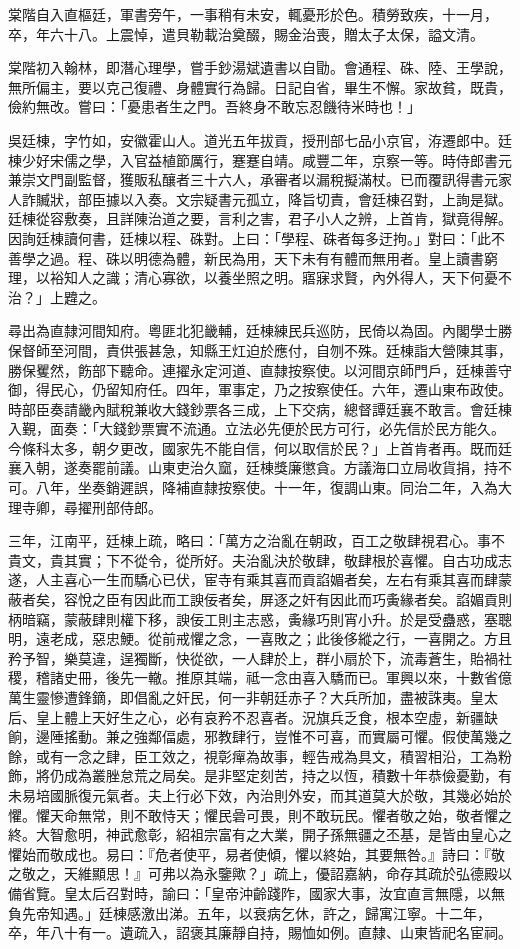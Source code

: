\begin{pinyinscope}
棠階自入直樞廷，軍書旁午，一事稍有未安，輒憂形於色。積勞致疾，十一月，卒，年六十八。上震悼，遣貝勒載治奠醊，賜金治喪，贈太子太保，謚文清。

棠階初入翰林，即潛心理學，嘗手鈔湯斌遺書以自勖。會通程、硃、陸、王學說，無所偏主，要以克己復禮、身體實行為歸。日記自省，畢生不懈。家故貧，既貴，儉約無改。嘗曰：「憂患者生之門。吾終身不敢忘忍饑待米時也！」

吳廷棟，字竹如，安徽霍山人。道光五年拔貢，授刑部七品小京官，洊遷郎中。廷棟少好宋儒之學，入官益植節厲行，蹇蹇自靖。咸豐二年，京察一等。時侍郎書元兼崇文門副監督，獲販私釀者三十六人，承審者以漏稅擬滿杖。已而覆訊得書元家人詐贓狀，部臣據以入奏。文宗疑書元孤立，降旨切責，會廷棟召對，上詢是獄。廷棟從容敷奏，且詳陳治道之要，言利之害，君子小人之辨，上首肯，獄竟得解。因詢廷棟讀何書，廷棟以程、硃對。上曰：「學程、硃者每多迂拘。」對曰：「此不善學之過。程、硃以明德為體，新民為用，天下未有有體而無用者。皇上讀書窮理，以裕知人之識；清心寡欲，以養坐照之明。寤寐求賢，內外得人，天下何憂不治？」上韙之。

尋出為直隸河間知府。粵匪北犯畿輔，廷棟練民兵巡防，民倚以為固。內閣學士勝保督師至河間，責供張甚急，知縣王灴迫於應付，自刎不殊。廷棟詣大營陳其事，勝保矍然，飭部下聽命。連擢永定河道、直隸按察使。以河間京師門戶，廷棟善守御，得民心，仍留知府任。四年，軍事定，乃之按察使任。六年，遷山東布政使。時部臣奏請畿內賦稅兼收大錢鈔票各三成，上下交病，總督譚廷襄不敢言。會廷棟入覲，面奏：「大錢鈔票實不流通。立法必先便於民方可行，必先信於民方能久。今條科太多，朝夕更改，國家先不能自信，何以取信於民？」上首肯者再。既而廷襄入朝，遂奏罷前議。山東吏治久窳，廷棟獎廉懲貪。方議海口立局收貨捐，持不可。八年，坐奏銷遲誤，降補直隸按察使。十一年，復調山東。同治二年，入為大理寺卿，尋擢刑部侍郎。

三年，江南平，廷棟上疏，略曰：「萬方之治亂在朝政，百工之敬肆視君心。事不貴文，貴其實；下不從令，從所好。夫治亂決於敬肆，敬肆根於喜懼。自古功成志遂，人主喜心一生而驕心已伏，宦寺有乘其喜而貢諂媚者矣，左右有乘其喜而肆蒙蔽者矣，容悅之臣有因此而工諛佞者矣，屏逐之奸有因此而巧夤緣者矣。諂媚貢則柄暗竊，蒙蔽肆則權下移，諛佞工則主志惑，夤緣巧則宵小升。於是受蠱惑，塞聰明，遠老成，惡忠鯁。從前戒懼之念，一喜敗之；此後侈縱之行，一喜開之。方且矜予智，樂莫違，逞獨斷，快從欲，一人肆於上，群小扇於下，流毒蒼生，貽禍社稷，稽諸史冊，後先一轍。推原其端，祗一念由喜入驕而已。軍興以來，十數省億萬生靈慘遭鋒鏑，即倡亂之奸民，何一非朝廷赤子？大兵所加，盡被誅夷。皇太后、皇上體上天好生之心，必有哀矜不忍喜者。況旗兵乏食，根本空虛，新疆缺餉，邊陲搖動。兼之強鄰偪處，邪教肆行，豈惟不可喜，而實屬可懼。假使萬幾之餘，或有一念之肆，臣工效之，視彰癉為故事，輕告戒為具文，積習相沿，工為粉飾，將仍成為叢脞怠荒之局矣。是非堅定刻苦，持之以恆，積數十年恭儉憂勤，有未易培國脈復元氣者。夫上行必下效，內治則外安，而其道莫大於敬，其幾必始於懼。懼天命無常，則不敢恃天；懼民碞可畏，則不敢玩民。懼者敬之始，敬者懼之終。大智愈明，神武愈彰，紹祖宗富有之大業，開子孫無疆之丕基，是皆由皇心之懼始而敬成也。易曰：『危者使平，易者使傾，懼以終始，其要無咎。』詩曰：『敬之敬之，天維顯思！』可弗以為永鑒歟？」疏上，優詔嘉納，命存其疏於弘德殿以備省覽。皇太后召對時，諭曰：「皇帝沖齡踐阼，國家大事，汝宜直言無隱，以無負先帝知遇。」廷棟感激出涕。五年，以衰病乞休，許之，歸寓江寧。十二年，卒，年八十有一。遺疏入，詔褒其廉靜自持，賜恤如例。直隸、山東皆祀名宦祠。


\end{pinyinscope}
